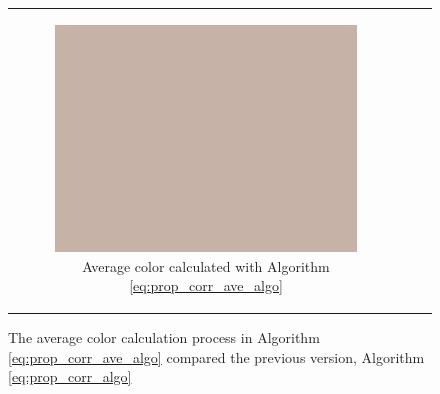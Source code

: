 \begin{figure}[H]
\begin{tabular}{ccc}
\begin{subfigure}[b]{0.30\textwidth}
        \includegraphics[width=\textwidth]{images/ave_col_10}
        \caption{Average color calculated with Algorithm \ref{eq:prop_corr_ave_algo}}\label{img:ave_col_10}
    \end{subfigure}
\end{tabular}
\caption{The average color calculation process in Algorithm \ref{eq:prop_corr_ave_algo} compared the previous version, Algorithm \ref{eq:prop_corr_algo}}\label{img:10_perc_mask}
\end{figure}